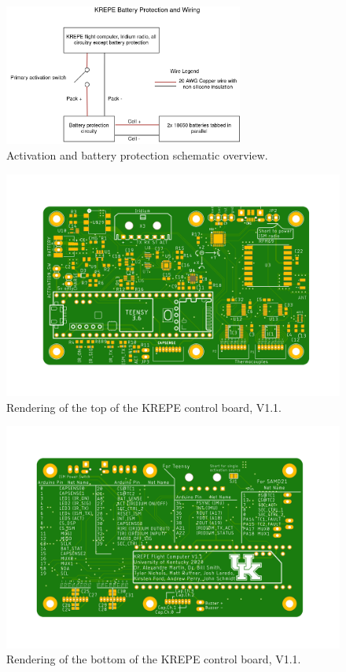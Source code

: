 \documentclass{article}
\begin{document}
\begin{figure}[H]
    \centering
    \includegraphics[width=0.7\textwidth]{images/krepe-electrical-overview.png}
    \caption{Activation and battery protection schematic overview.}
    \label{fig:activation-circuitry}
\end{figure}


\begin{figure}[H]
    \centering
    \includegraphics[width=\textwidth]{images/krepe-top.png}
    \caption{Rendering of the top of the KREPE control board, V1.1.}
    \label{fig:board-top}
\end{figure}


\begin{figure}[H]
    \centering
    \includegraphics[width=\textwidth]{images/krepe-bottom.png}
    \caption{Rendering of the bottom of the KREPE control board, V1.1.}
    \label{fig:board-bottom}
\end{figure}
\end{document}
